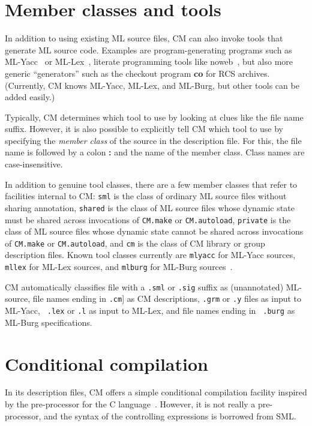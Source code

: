 \documentclass{article}
\begin{document}
\section{Member classes and tools}
\label{sec:classes}

In addition to using existing ML source files, CM can also invoke
tools that generate ML source code.  Examples are
program-generating programs such as ML-Yacc~\cite{tarditi90:yacc} or
ML-Lex~\cite{appel89:lex}, literate programming tools like
noweb~\cite{ramsey:simplified}, but also more generic ``generators''
such as the checkout program {\bf co} for RCS archives.
(Currently, CM knows ML-Yacc, ML-Lex, and ML-Burg, but other tools can
be added easily.)

Typically, CM determines which tool to use by looking at clues like
the file name suffix.  However, it is also possible to explicitly tell
CM which tool to use by specifying the {\em member class} of the
source in the description file.  For this, the file name is followed
by a colon {\bf :} and the name of the member class.  Class names are
case-insensitive.

In addition to genuine tool classes, there are a few member classes
that refer to facilities internal to CM: {\tt sml} is the class of
ordinary ML source files without sharing annotation, {\tt shared} is
the class of ML source files whose dynamic state must be shared across
invocations of {\tt CM.make} or {\tt CM.autoload}, {\tt private} is
the class of ML source files whose dynamic state cannot be shared
across invocations of {\tt CM.make} or {\tt CM.autoload}, and {\tt cm}
is the class of CM library or group description files.  Known tool
classes currently are {\tt mlyacc} for ML-Yacc sources, {\tt mllex}
for ML-Lex sources, and {\tt mlburg} for ML-Burg
sources~\cite{mlburg93}.

CM automatically classifies file with a {\tt .sml} or {\tt .sig} suffix
as (unannotated) ML-source, file names ending in {\tt .cm}] as CM
descriptions, {\tt .grm} or {\tt .y} files as input to ML-Yacc, {\tt
.lex} or {\tt .l} as input to ML-Lex, and file names ending in {\tt
.burg} as ML-Burg specifications.

\section{Conditional compilation}
\label{sec:preproc}

In its description files, CM offers a simple conditional
compilation facility inspired by the pre-processor for the C
language~\cite{k&r2}.  However, it is not really a pre-processor, and
the syntax of the controlling expressions is borrowed from SML.
\end{document}
